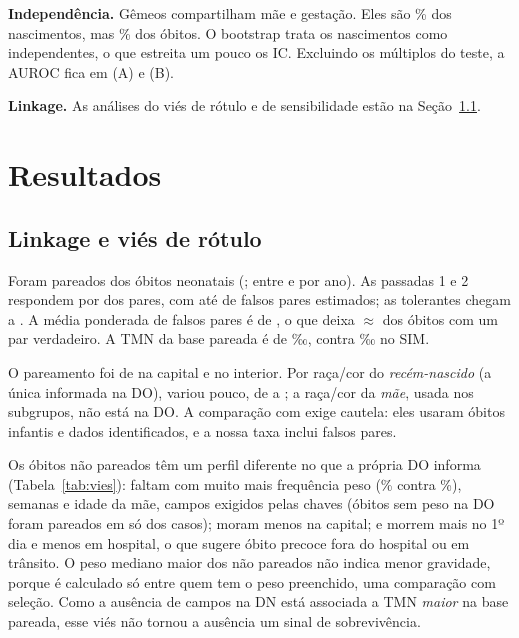 \documentclass[12pt]{article}
\begin{document}
\textbf{Independência.} Gêmeos compartilham mãe e gestação. Eles são \pctMult{}\% dos nascimentos, mas \pctObMult{}\% dos óbitos. O bootstrap trata os nascimentos como independentes, o que estreita um pouco os IC. Excluindo os múltiplos do teste, a AUROC fica em \aurocUnicosA{} (A) e \aurocUnicosB{} (B).

\textbf{Linkage.} As análises do viés de rótulo e de sensibilidade estão na Seção~\ref{sec:vies}.

\section{Resultados}

\subsection{Linkage e viés de rótulo}
\label{sec:vies}

Foram pareados \nPareados{} dos \nObitosSIM{} óbitos neonatais (\pctPareado{}; entre \pctPareadoMin{} e \pctPareadoMax{} por ano). As passadas 1 e 2 respondem por \pctParesUmDois{} dos pares, com até \falsosUmDoisMax{} de falsos pares estimados; as tolerantes chegam a \falsosMax{}. A média ponderada de falsos pares é de \falsosPonderado{}, o que deixa $\approx$\pctVerdadeiros{} dos óbitos com um par verdadeiro. A TMN da base pareada é de \tmnPareada{}‰, contra \tmnSIM{}‰ no SIM.

O pareamento foi de \linkCap{} na capital e \linkInt{} no interior. Por raça/cor do \emph{recém-nascido} (a única informada na DO), variou pouco, de \linkRacaMin{} a \linkRacaMax{}; a raça/cor da \emph{mãe}, usada nos subgrupos, não está na DO. A comparação com \cite{maia2017} exige cautela: eles usaram óbitos infantis e dados identificados, e a nossa taxa inclui falsos pares.

Os \nNaoPareados{} óbitos não pareados têm um perfil diferente no que a própria DO informa (Tabela~\ref{tab:vies}): faltam com muito mais frequência peso (\nparPesoAus{}\% contra \parPesoAus{}\%), semanas e idade da mãe, campos exigidos pelas chaves (óbitos sem peso na DO foram pareados em só \linkPesoAus{} dos casos); moram menos na capital; e morrem mais no 1º dia e menos em hospital, o que sugere óbito precoce fora do hospital ou em trânsito.
O peso mediano maior dos não pareados não indica menor gravidade, porque é calculado só entre quem tem o peso preenchido, uma comparação com seleção. Como a ausência de campos na DN está associada a TMN \emph{maior} na base pareada, esse viés não tornou a ausência um sinal de sobrevivência.
\end{document}
